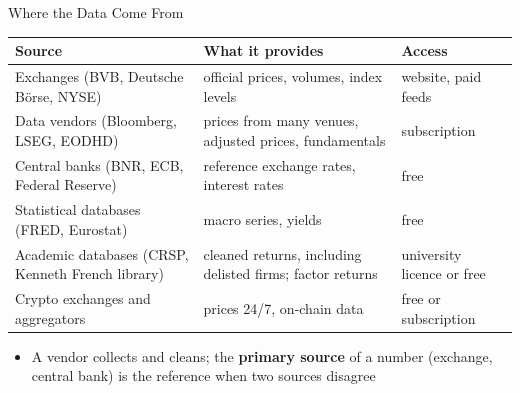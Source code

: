 \begin{frame}{Where the Data Come From}
\itemsize{\small}
\begin{center}
\footnotesize
\begin{tabular}{>{\raggedright\arraybackslash}p{3.4cm}>{\raggedright\arraybackslash}p{5.6cm}>{\raggedright\arraybackslash}p{3.4cm}}
\toprule
\textbf{Source} & \textbf{What it provides} & \textbf{Access} \\
\midrule
Exchanges (BVB, Deutsche Börse, NYSE) & official prices, volumes, index levels & website, paid feeds \\
Data vendors (Bloomberg, LSEG, EODHD) & prices from many venues, adjusted prices, fundamentals & subscription \\
Central banks (BNR, ECB, Federal Reserve) & reference exchange rates, interest rates & free \\
Statistical databases (FRED, Eurostat) & macro series, yields & free \\
Academic databases (CRSP, Kenneth French library) & cleaned returns, including delisted firms; factor returns & university licence or free \\
Crypto exchanges and aggregators & prices 24/7, on-chain data & free or subscription \\
\bottomrule
\end{tabular}
\end{center}
\begin{itemize}
    \item A vendor collects and cleans; the \textbf{primary source} of a number (exchange, central bank) is the reference when two sources disagree
\end{itemize}
\end{frame}

